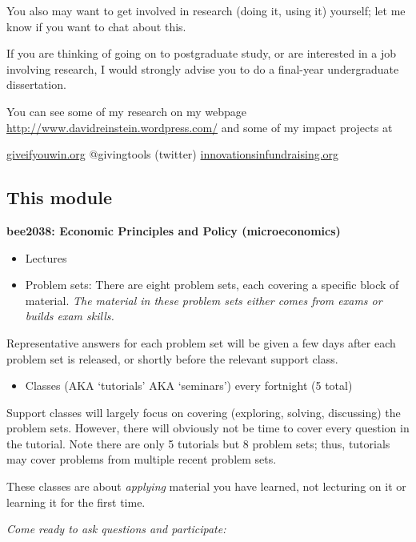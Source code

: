 \documentclass[]{article}
\providecommand{\tightlist}{%
  \setlength{\itemsep}{0pt}\setlength{\parskip}{0pt}}
\begin{document}
\bigskip

You also may want to get involved in research (doing it, using it) yourself; let me know if you want to chat about this.

If you are thinking of going on to postgraduate study, or are interested in a job involving research, I would strongly advise you to do a final-year undergraduate dissertation.

You can see some of my research on my webpage \url{http://www.davidreinstein.wordpress.com/} and some of my impact projects at

\url{giveifyouwin.org}
@givingtools (twitter)
\url{innovationsinfundraising.org}

\hypertarget{this-module}{%
\subsection{This module}\label{this-module}}

\textbf{bee2038: Economic Principles and Policy (microeconomics)}

\begin{itemize}
\item
  Lectures
\item
  Problem sets: There are eight problem sets, each covering a specific block of material. \emph{The material in these problem sets either comes from exams or builds exam skills.}
\end{itemize}

Representative answers for each problem set will be given a few days after each problem set is released, or shortly before the relevant support class.

\begin{itemize}
\tightlist
\item
  Classes (AKA `tutorials' AKA `seminars') every fortnight (5 total)
\end{itemize}

Support classes will largely focus on covering (exploring, solving, discussing) the problem sets. However, there will obviously not be time to cover every question in the tutorial. Note there are only 5 tutorials but 8 problem sets; thus, tutorials may cover problems from multiple recent problem sets.

These classes are about \emph{applying} material you have learned, not lecturing on it or learning it for the first time.

\bigskip

\emph{Come ready to ask questions and participate:}
\end{document}
